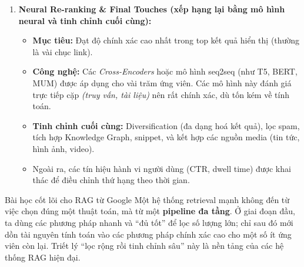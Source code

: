 \begin{enumerate}
	\item \textbf{Neural Re-ranking \& Final Touches (xếp hạng lại bằng mô hình neural và tinh chỉnh cuối cùng):}
	\begin{itemize}
		\item \textbf{Mục tiêu:} Đạt độ chính xác cao nhất trong top kết quả hiển thị (thường là vài chục link).
		\item \textbf{Công nghệ:} Các \emph{Cross-Encoders} hoặc mô hình seq2seq (như T5, BERT, MUM) được áp dụng cho vài trăm ứng viên. Các mô hình này đánh giá trực tiếp cặp \emph{(truy vấn, tài liệu)} nên rất chính xác, dù tốn kém về tính toán.
		\item \textbf{Tinh chỉnh cuối cùng:} Diversification (đa dạng hoá kết quả), lọc spam, tích hợp Knowledge Graph, snippet, và kết hợp các nguồn media (tin tức, hình ảnh, video).
		\item Ngoài ra, các tín hiệu hành vi người dùng (CTR, dwell time) được khai thác để điều chỉnh thứ hạng theo thời gian.
	\end{itemize}
\end{enumerate}

\begin{assess}{Bài học cốt lõi cho RAG từ Google}
	Một hệ thống retrieval mạnh không đến từ việc chọn đúng một thuật toán, mà từ một \textbf{pipeline đa tầng}. Ở giai đoạn đầu, ta dùng các phương pháp nhanh và “đủ tốt” để lọc số lượng lớn; chỉ sau đó mới dồn tài nguyên tính toán vào các phương pháp chính xác cao cho một số ít ứng viên còn lại. Triết lý “lọc rộng rồi tinh chỉnh sâu” này là nền tảng của các hệ thống RAG hiện đại.
\end{assess}
